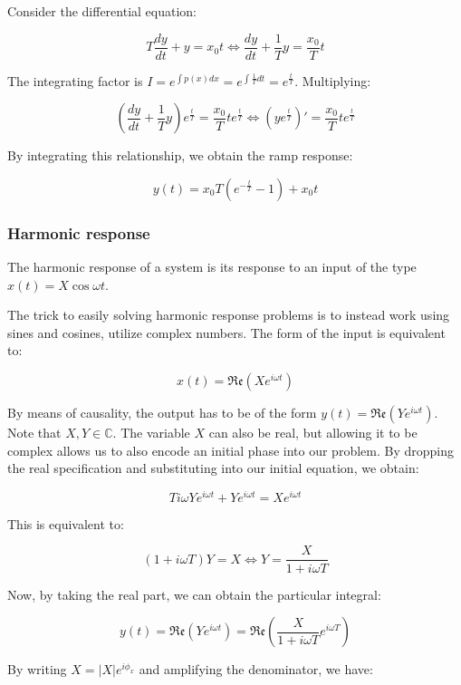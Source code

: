 \documentclass[12pt]{article}
\begin{document}
Consider the differential equation:

\[ T\frac{dy}{dt} + y = x_0t \iff \frac{dy}{dt} + \frac{1}{T}y = \frac{x_0}{T}t \]

The integrating factor is $I = e^{\int p(x)dx} = e^{\int \frac{1}{T}dt} = e^{\frac{t}{T}}$. Multiplying:

\[ \left(\frac{dy}{dt} + \frac{1}{T}y\right)e^{\frac{t}{T}} = \frac{x_0}{T}te^{\frac{t}{T}} \iff \left(ye^{\frac{t}{T}}\right)' = \frac{x_0}{T}te^{\frac{t}{T}} \]

By integrating this relationship, we obtain the ramp response:

\[ y(t) = x_0T\left(e^{-\frac{t}{T}} - 1\right) + x_0t \]

\subsubsection{Harmonic response}

\begin{definition}
  The harmonic response of a system is its response to an input of the type $x(t) = X\cos{\omega t}$.
\end{definition}

The trick to easily solving harmonic response problems is to instead work using sines and cosines, utilize complex numbers. The form of the input is equivalent to:

\[ x(t) = \mathfrak{Re}{(Xe^{i\omega t})} \]

By means of causality, the output has to be of the form $y(t) = \mathfrak{Re}{(Ye^{i\omega t})}$. Note that $X, Y \in \mathbb{C}$. The variable $X$ can also be real, but allowing it to be complex allows us to also encode an initial phase into our problem. By dropping the real specification and substituting into our initial equation, we obtain:

\[ Ti\omega Ye^{i\omega t} + Ye^{i \omega t} = Xe^{i \omega t} \]

This is equivalent to:

\[ (1 + i\omega T)Y = X \iff Y = \frac{X}{1 + i \omega T} \]

Now, by taking the real part, we can obtain the particular integral:

\[ y(t) = \mathfrak{Re}\left(Ye^{i\omega t}\right) = \mathfrak{Re}\left(\frac{X}{1 + i\omega T}e^{i \omega T}\right) \]

By writing $X = |X|e^{i\phi_x}$ and amplifying the denominator, we have:
\end{document}
